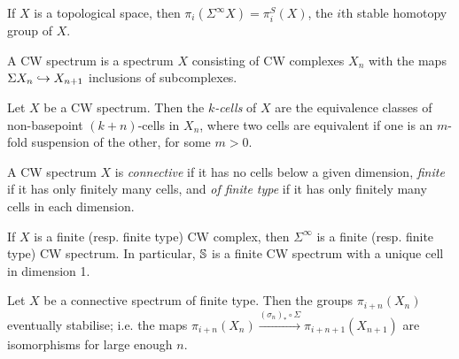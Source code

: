 \documentclass{MetricNotes2023}
\def\bb{\ensuremath\mathbb}
\def\inj{\ensuremath\hookrightarrow}
\begin{document}
\begin{example}
If \(X\) is a topological space, then \(\pi_i(\Sigma^\infty X)=\pi_i^S(X)\), the \(i\)th stable homotopy group of \(X\). 
\end{example}

\begin{definition}
A CW spectrum is a spectrum \(X\) consisting of CW complexes \(X_n\) with the maps \(\Sigma X_n \inj X_{n+1}\) inclusions of subcomplexes. 
\end{definition}

\begin{definition}
Let \(X\) be a CW spectrum. Then the \textit{\(k\)-cells} of \(X\) are the equivalence classes of non-basepoint \((k+n)\)-cells in \(X_n\), where two cells are equivalent if one is an \(m\)-fold suspension of the other, for some \(m>0\). 
\end{definition}


\begin{definition}
A CW spectrum \(X\) is \textit{connective} if it has no cells below a given dimension, \textit{finite} if it has only finitely many cells, and \textit{of finite type} if it has only finitely many cells in each dimension.
\end{definition}

\begin{example}
If \(X\) is a finite (resp. finite type) CW complex, then \(\Sigma^\infty\) is a finite (resp. finite type) CW spectrum. In particular, \(\bb{S}\) is a finite CW spectrum with a unique cell in dimension 1.
\end{example}

\begin{lemma}\label{2504151105}
Let \(X\) be a connective spectrum of finite type. Then the groups \(\pi_{i+n}(X_n)\) eventually stabilise; i.e. the maps \(\pi_{i+n}(X_n) \xrightarrow{(\sigma_n)_*\circ \Sigma} \pi_{i+n+1}(X_{n+1})\) are isomorphisms for large enough \(n\). 
\end{lemma}
\end{document}
